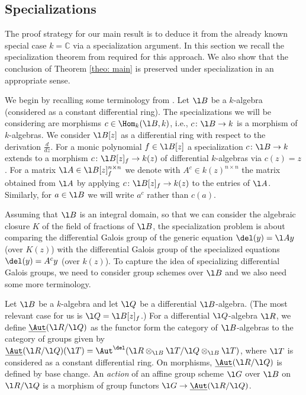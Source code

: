 \documentclass[a4paper, 11pt]{article}
\begin{document}
\subsection{Specializations}

The proof strategy for our main result is to deduce it from the already known special case $k=\mathbb{C}$ via a specialization argument. In this section we recall the specialization theorem from \cite{fengwib} required for this approach. We also show that the conclusion of Theorem \ref{theo: main} is preserved under specialization in an appropriate sense.



We begin by recalling some terminology from \cite{fengwib}. Let $\l B$ be a $k$-algebra (considered as a constant differential ring). The specializations we will be considering are morphisms $c\in \Hom_k(\l B,k)$, i.e., $c\colon \l B\to k$ is a morphism of $k$-algebras. We consider $\l B[z]$ as a differential ring with respect to the derivation $\frac{d}{dz}$. For a monic polynomial $f\in \l B[z]$ a specialization $c\colon \l B\to k$ extends to a morphism $c\colon \l B[z]_f\to k(z)$ of differential $k$-algebras via $c(z)=z$.
For a matrix $\l A\in \l B[z]_f^{n\times n}$ we denote with $A^c\in k(z)^{n\times n}$ the matrix obtained from $\l A$ by applying $c\colon \l B[z]_f\to k(z)$ to the entries of $\l A$. Similarly, for $a\in \l B$ we will write $a^c$ rather than $c(a)$.


 Assuming that $\l B$ is an integral domain, so that we can consider the algebraic closure $K$ of the field of fractions of $\l B$, the specialization problem is about comparing the differential Galois group of the generic equation $\del(y)=\l A y$ (over $K(z)$) with the differential Galois group of the specialized equations $\del(y)=A^cy$ (over $k(z)$). To capture the idea of specializing differential Galois groups, we need to consider group schemes over $\l B$ and we also need some more terminology.





 Let $\l B$ be a $k$-algebra and let $\l Q$ be a differential $\l B$-algebra. (The most relevant case for us is $\l Q=\l B[z]_f$.) For a differential $\l Q$-algebra $\l R$, we define $\underline{\Aut}(\l R/\l Q)$ as the functor form the category of $\l B$-algebras to the category of groups given by $\underline{\Aut}(\l R/\l Q)(\l T) = \Aut^\del(\l R \otimes_{\l B} \l T / \l Q \otimes_{\l B} \l T)$, where $\l T$ is considered as a constant differential ring. On morphisms, $\underline{\Aut}(\l R / \l Q)$ is defined by base change.
An \emph{action} of an affine group scheme $\l G$ over $\l B$ on $\l R/\l Q$ is a morphism of group functors $\l G \to \underline{\Aut}(\l R/\l Q)$.
\end{document}
